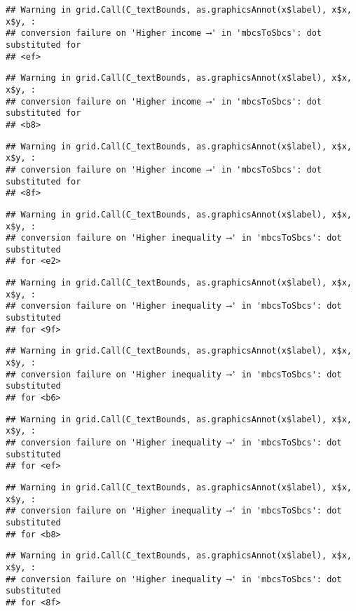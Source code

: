 \documentclass[
]{article}
\begin{document}
\begin{verbatim}
## Warning in grid.Call(C_textBounds, as.graphicsAnnot(x$label), x$x, x$y, :
## conversion failure on 'Higher income ⟶️' in 'mbcsToSbcs': dot substituted for
## <ef>
\end{verbatim}

\begin{verbatim}
## Warning in grid.Call(C_textBounds, as.graphicsAnnot(x$label), x$x, x$y, :
## conversion failure on 'Higher income ⟶️' in 'mbcsToSbcs': dot substituted for
## <b8>
\end{verbatim}

\begin{verbatim}
## Warning in grid.Call(C_textBounds, as.graphicsAnnot(x$label), x$x, x$y, :
## conversion failure on 'Higher income ⟶️' in 'mbcsToSbcs': dot substituted for
## <8f>
\end{verbatim}

\begin{verbatim}
## Warning in grid.Call(C_textBounds, as.graphicsAnnot(x$label), x$x, x$y, :
## conversion failure on 'Higher inequality ⟶️' in 'mbcsToSbcs': dot substituted
## for <e2>
\end{verbatim}

\begin{verbatim}
## Warning in grid.Call(C_textBounds, as.graphicsAnnot(x$label), x$x, x$y, :
## conversion failure on 'Higher inequality ⟶️' in 'mbcsToSbcs': dot substituted
## for <9f>
\end{verbatim}

\begin{verbatim}
## Warning in grid.Call(C_textBounds, as.graphicsAnnot(x$label), x$x, x$y, :
## conversion failure on 'Higher inequality ⟶️' in 'mbcsToSbcs': dot substituted
## for <b6>
\end{verbatim}

\begin{verbatim}
## Warning in grid.Call(C_textBounds, as.graphicsAnnot(x$label), x$x, x$y, :
## conversion failure on 'Higher inequality ⟶️' in 'mbcsToSbcs': dot substituted
## for <ef>
\end{verbatim}

\begin{verbatim}
## Warning in grid.Call(C_textBounds, as.graphicsAnnot(x$label), x$x, x$y, :
## conversion failure on 'Higher inequality ⟶️' in 'mbcsToSbcs': dot substituted
## for <b8>
\end{verbatim}

\begin{verbatim}
## Warning in grid.Call(C_textBounds, as.graphicsAnnot(x$label), x$x, x$y, :
## conversion failure on 'Higher inequality ⟶️' in 'mbcsToSbcs': dot substituted
## for <8f>
\end{verbatim}
\end{document}
